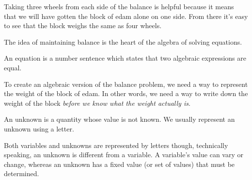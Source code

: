 \begin{center}
\end{center}

Taking three wheels from each side of the balance is helpful because it means that we will have gotten the block of edam alone on one side. From there it's easy to see that the block weighs the same as four wheels.

The idea of maintaining balance is the heart of the algebra of solving equations.

\begin{boxeddef}[Equation]
An \gls{equation} is a number sentence which states that two algebraic expressions are equal.
\end{boxeddef}

To create an algebraic version of the balance problem, we need a way to represent the weight of the block of edam. In other words, we need a way to write down the weight of the block \textit{before we know what the weight actually is}.

\begin{boxeddef}[Unknown]
An \gls{unknown} is a quantity whose value is not known. We usually represent an unknown using a letter.

Both variables and unknowns are represented by letters though, technically speaking, an unknown is different from a variable. A variable's value can vary or change, whereas an unknown has a fixed value (or set of values) that must be determined.
\end{boxeddef}

